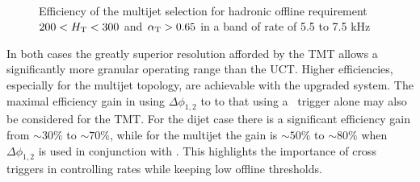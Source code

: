 \begin{figure}
\centering
	~
	\caption{Efficiency of the multijet selection for hadronic offline requirement $200 < \mbox{$H_\text{T}$} < 300$ and $\alpha_{\text{T}} > 0.65$
	in a band of rate of 5.5 to 7.5 kHz}	
	    \label{fig:multijet_cross}
\end{figure}

In both cases the greatly superior resolution afforded by the TMT allows a significantly
more granular operating range than the UCT. Higher efficiencies, especially for the multijet topology, 
are achievable with the upgraded system. The maximal efficiency gain in using $\Delta\phi_{1,2}$ to 
to that using a \scalht~trigger alone may also be considered for the TMT. For the dijet case there is a 
significant efficiency gain from $\sim 30\%$ to $\sim 70\%$, while for the multijet the gain is 
$\sim 50\%$ to $\sim 80\%$ when $\Delta\phi_{1,2}$ is used in conjunction with \scalht.
This highlights the importance of cross triggers in controlling rates while 
keeping low offline thresholds.

